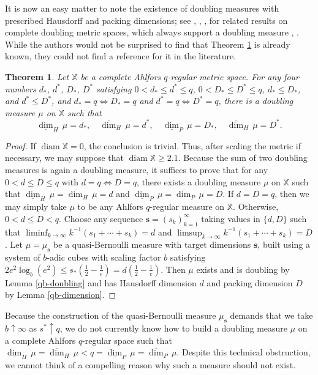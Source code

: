 \documentclass[12pt]{amsart}
\newtheorem{theorem}{Theorem}[section]
\theoremstyle{definition}
\theoremstyle{remark}
\newcommand{\XX}{\mathbb{X}}
\newcommand{\diam}{\mathop\mathrm{diam}\nolimits}
\newcommand{\muse}{\mu_{\mathbf{s}}}
\numberwithin{figure}{section}
\numberwithin{equation}{section}
\begin{document}
It is now an easy matter to note the existence of doubling measures with prescribed Hausdorff and packing dimensions; see \cite{Wu-dimension}, \cite{Bylund-Gudayol}, \cite{KRS-cubes}, \cite{no-AR-subsets} for related results on complete doubling metric spaces, which always support a doubling measure \cite{doubling-exists}, \cite{VK-doubling}. While the authors would not be surprised to find that Theorem \ref{t:prescribe} is already known, they could not find a reference for it in the literature.

\begin{theorem}\label{t:prescribe} Let $\XX$ be a complete Ahlfors $q$-regular metric space. For any four numbers $d_*$, $d^*$, $D_*$, $D^*$ satisfying $0<d_*\leq d^*\leq q$, $0<D_*\leq D^*\leq q$, $d_*\leq D_*$, and $d^*\leq D^*$, and $d_*=q\Leftrightarrow D_*=q$ and $d^*=q\Leftrightarrow D^*=q$, there is a doubling measure $\mu$ on $\XX$ such that \begin{equation}\label{haus-pack-dims}\underline{\dim}_H\,\mu=d_*,\quad \overline{\dim}_H\,\mu=d^*,\quad \underline{\dim}_P\,\mu=D_*,\quad \overline{\dim}_H\,\mu=D^*.\end{equation}\end{theorem}

\begin{proof} If $\diam \XX=0$, the conclusion is trivial. Thus, after scaling the metric if necessary, we may suppose that $\diam\XX\geq 2.1$. Because the sum of two doubling measures is again a doubling measure, it suffices to prove that for any $0<d\leq D\leq q$ with $d=q\Leftrightarrow D=q$, there exists a doubling measure $\mu$ on $\XX$ such that $\underline{\dim}_H\,\mu=\overline{\dim}_H\,\mu=d$ and $\underline{\dim}_P\,\mu=\overline{\dim}_P\,\mu=D$. If $d=D=q$, then we may simply take $\mu$ to be any Ahlfors $q$-regular measure on $\XX$. Otherwise, $0<d\leq D<q$. Choose any sequence $\mathbf{s}=(s_k)_{k=1}^\infty$ taking values in $\{d,D\}$ such that $\liminf_{k\rightarrow\infty} k^{-1}(s_1+\cdots+s_k)=d$ and $\limsup_{k\rightarrow\infty} k^{-1}(s_1+\cdots+s_k)=D$. Let $\mu=\muse$ be a quasi-Bernoulli measure with target dimensions $\mathbf{s}$, built using a system of $b$-adic cubes with scaling factor $b$ satisfying $2e^2\log_b(e^2)\leq s_*(\tfrac12-\tfrac{1}{e})=d(\tfrac{1}{2}-\tfrac{1}{e})$. Then $\mu$ exists and is doubling by Lemma \ref{qb-doubling} and has Hausdorff dimension $d$ and packing dimension $D$ by Lemma \ref{qb-dimension}.\end{proof}

Because the construction of the quasi-Bernoulli measure $\muse$ demands that we take $b\uparrow\infty$ as $s^*\uparrow q$, we do not currently know how to build a doubling measure $\mu$ on a complete Ahlfors $q$-regular space such that $\underline{\dim}_H\,\mu=\overline{\dim}_H\,\mu<q=\underline{\dim}_P\,\mu=\overline{\dim}_P\,\mu$. Despite this technical obstruction, we cannot think of a compelling reason why such a measure should not exist.
\end{document}
